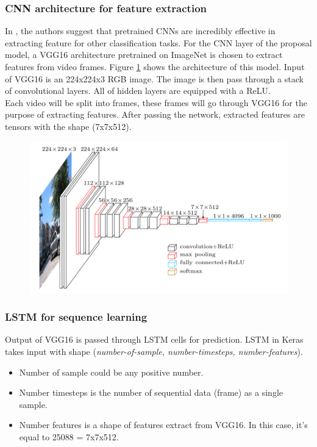 \subsubsection{CNN architecture for feature extraction}
In \cite{DBLP:journals/corr/ZhouKLOT14}, the authors suggest that pretrained CNNs are incredibly effective in extracting feature for other classification tasks.
For the CNN layer of the proposal model, a VGG16 \cite{DBLP:journals/corr/SimonyanZ14a} architecture pretrained on ImageNet  is chosen to extract features from video frames. Figure \ref{chap3:vgg16_architecture} shows the architecture of this model. Input of VGG16 is an 224x224x3 RGB image. The image is then pass through a stack of convolutional layers. All of hidden layers are equipped with a ReLU.\\
Each video will be split into frames, these frames will go through VGG16 for the purpose of extracting features. After passing the network, extracted features are tensors with the shape (7x7x512).
\begin{center}
    \begin{figure}[H]
    \centering
    \includegraphics[width=1\columnwidth]{images/chap3/vgg16_architecture.png}
    \label{chap3:vgg16_architecture}
    \end{figure}
\end{center}
\vspace{-1cm}
\subsubsection{LSTM for sequence learning}
Output of VGG16 is passed through LSTM cells for prediction.
LSTM in Keras takes input with shape (\textit{number-of-sample, number-timesteps, number-features}).
\begin{itemize}
	\item Number of sample could be any positive number.
	\item Number timesteps is the number of sequential data (frame) as a single sample.
	\item Number features is a shape of features extract from VGG16. In this case, it's equal to 25088 = 7x7x512.
\end{itemize}

